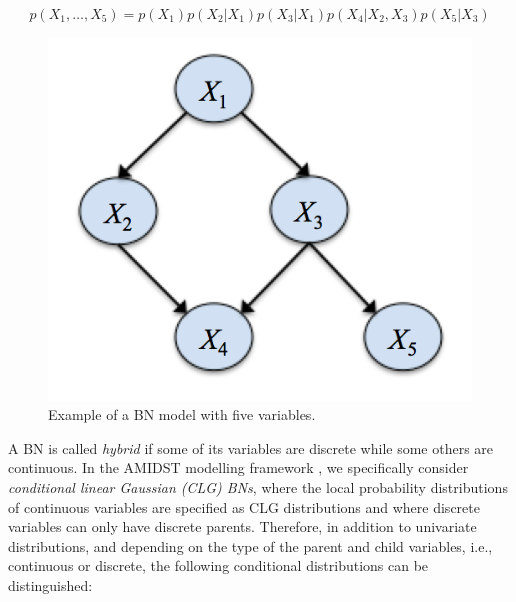 \vspace{-0.15in}
$$p(X_1,\ldots,X_5) = p(X_1) p(X_2|X_1) p(X_3|X_1) p(X_4|X_2,X_3) p(X_5|X_3)$$

\begin{figure}[ht!]
\begin{center}
\includegraphics[scale=0.55]{./figures/ExampleBN}
\caption{\label{Figure:ExampleBN}Example of a BN model with five variables.}
\end{center}
\end{figure}

A BN is called \emph{hybrid} if some of its variables are discrete while some others are continuous. In the AMIDST modelling framework \cite{Deliverable2.1}, we specifically consider \emph{conditional linear Gaussian (CLG) BNs}\cite{Lauritzen1992,lauritzen1996graphical,LauritzenJensen2001}, where the local probability distributions of continuous variables are specified as CLG distributions and where discrete variables can only have discrete parents. Therefore, in addition to univariate distributions, and depending on the type of the parent and child variables, i.e., continuous or discrete, the following conditional distributions can be distinguished:

\vspace{-0.1in}

